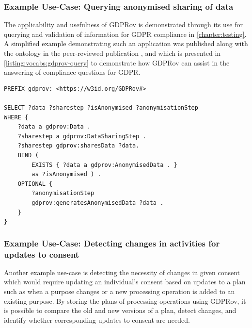 \subsubsection{Example Use-Case: Querying anonymised sharing of data}
The applicability and usefulness of GDPRov is demonstrated through its use for querying and validation of information for GDPR compliance in \autoref{chapter:testing}.
A simplified example demonstrating such an application was published along with the ontology in the peer-reviewed publication \cite{}, and which is presented in \autoref{listing:vocabs:gdprov-query} to demonstrate how GDPRov can assist in the answering of compliance questions for GDPR.

\begin{lstlisting}[label={listing:vocabs:gdprov-query},caption={SPARQL query demonstrating use of GDPRov in representing and retrieving steps, data, anonymity level, and anonymisation process based on sharing of data \cite{}}]
PREFIX gdprov: <https://w3id.org/GDPRov#>

SELECT ?data ?sharestep ?isAnonymised ?anonymisationStep
WHERE {
    ?data a gdprov:Data .
    ?sharestep a gdprov:DataSharingStep .
    ?sharestep gdprov:sharesData ?data. 
    BIND (
        EXISTS { ?data a gdprov:AnonymisedData . }
        as ?isAnonymised ) .
    OPTIONAL {
        ?anonymisationStep
        gdprov:generatesAnonymisedData ?data .
    }
}
\end{lstlisting}

\subsubsection{Example Use-Case: Detecting changes in activities for updates to consent}
Another example use-case is detecting the necessity of changes in given consent which would require updating an individual's consent based on updates to a plan such as when a purpose changes or a new processing operation is added to an existing purpose. By storing the plans of processing operations using GDPRov, it is possible to compare the old and new versions of a plan, detect changes, and identify whether corresponding updates to consent are needed. 

